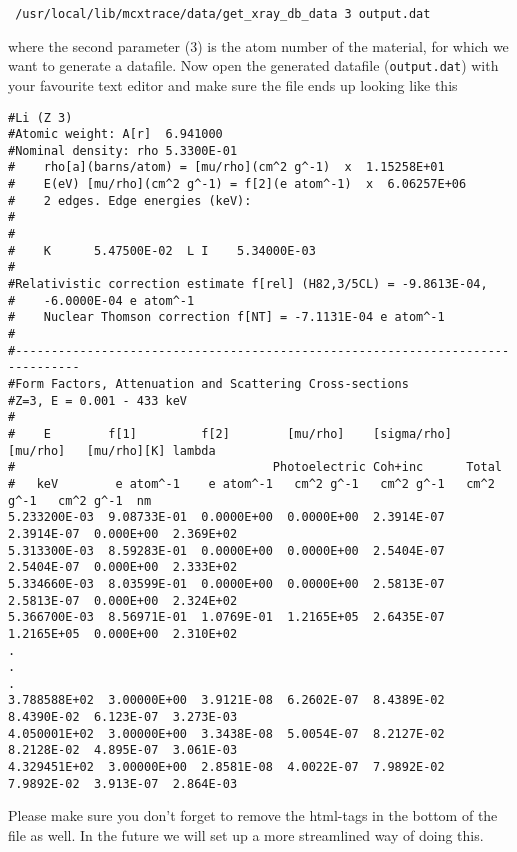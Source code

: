 \begin {verbatim}
 /usr/local/lib/mcxtrace/data/get_xray_db_data 3 output.dat
\end{verbatim}
where the second parameter (3) is the atom number of the material, for which we want to generate a datafile.
Now open the generated datafile (\verb+output.dat+) with your favourite text editor and make sure the file ends up looking like this
\tiny
\begin{verbatim}
#Li (Z 3)
#Atomic weight: A[r]  6.941000
#Nominal density: rho 5.3300E-01
#    rho[a](barns/atom) = [mu/rho](cm^2 g^-1)  x  1.15258E+01
#    E(eV) [mu/rho](cm^2 g^-1) = f[2](e atom^-1)  x  6.06257E+06
#    2 edges. Edge energies (keV):
#
#
#    K      5.47500E-02  L I    5.34000E-03
#
#Relativistic correction estimate f[rel] (H82,3/5CL) = -9.8613E-04,
#    -6.0000E-04 e atom^-1
#    Nuclear Thomson correction f[NT] = -7.1131E-04 e atom^-1
#
#-------------------------------------------------------------------------------
#Form Factors, Attenuation and Scattering Cross-sections
#Z=3, E = 0.001 - 433 keV
#
#    E        f[1]         f[2]        [mu/rho]    [sigma/rho]  [mu/rho]   [mu/rho][K] lambda
#                                    Photoelectric Coh+inc      Total
#   keV        e atom^-1    e atom^-1   cm^2 g^-1   cm^2 g^-1   cm^2 g^-1   cm^2 g^-1  nm
5.233200E-03  9.08733E-01  0.0000E+00  0.0000E+00  2.3914E-07  2.3914E-07  0.000E+00  2.369E+02
5.313300E-03  8.59283E-01  0.0000E+00  0.0000E+00  2.5404E-07  2.5404E-07  0.000E+00  2.333E+02
5.334660E-03  8.03599E-01  0.0000E+00  0.0000E+00  2.5813E-07  2.5813E-07  0.000E+00  2.324E+02
5.366700E-03  8.56971E-01  1.0769E-01  1.2165E+05  2.6435E-07  1.2165E+05  0.000E+00  2.310E+02
.
.
.
3.788588E+02  3.00000E+00  3.9121E-08  6.2602E-07  8.4389E-02  8.4390E-02  6.123E-07  3.273E-03
4.050001E+02  3.00000E+00  3.3438E-08  5.0054E-07  8.2127E-02  8.2128E-02  4.895E-07  3.061E-03
4.329451E+02  3.00000E+00  2.8581E-08  4.0022E-07  7.9892E-02  7.9892E-02  3.913E-07  2.864E-03
\end{verbatim}
\normalsize
Please make sure you don't forget to remove the html-tags in the bottom of the file as well. In the future we will set
up a more streamlined way of doing this.

